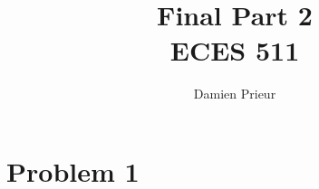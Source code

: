 \documentclass{article}
\author{Damien Prieur}
\title{Final Part 2\\ ECES 511}
\date{}
\begin{document}
\maketitle

\section*{Problem 1}
\end{document}
